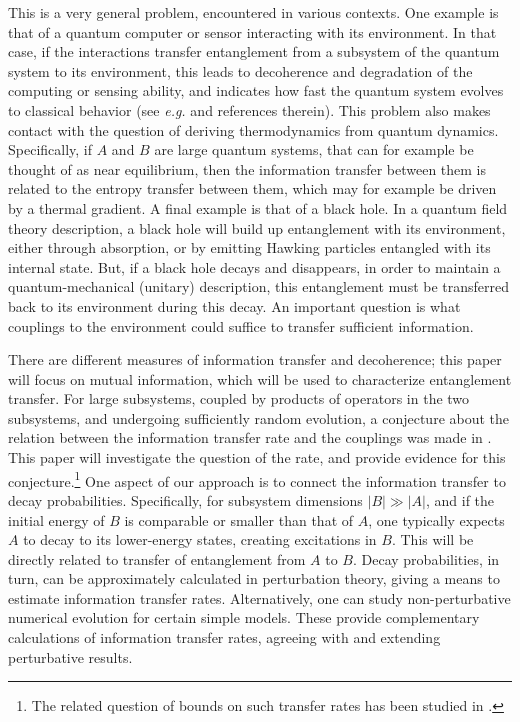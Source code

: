 \documentclass[aps,prd,groupedaddress,nofootinbib,letterpaper]{revtex4}
\begin{document}
This is a very general problem, encountered in various contexts.  One example is that of a quantum computer or sensor interacting with its environment.  In that case, if the interactions transfer entanglement from a subsystem of the quantum system to its environment, this leads to decoherence and degradation of the computing or sensing ability, and indicates how fast the quantum system evolves to classical behavior (see {\it e.g.} \cite{Ahar, Schl} and references therein).  This problem also makes contact with the question of deriving thermodynamics from quantum dynamics\cite{GoEi,GHRRS}.  Specifically, if $A$ and $B$ are large quantum systems, that can for example be thought of as near equilibrium, then the information transfer between them is related to the entropy transfer between them, which may for example be driven by a thermal gradient.  A final example is that of a black hole.  In a quantum field theory description, a black hole will build up entanglement with its environment, either through absorption, or by emitting Hawking particles entangled with its internal state.  But, if a black hole decays and disappears, in order to maintain a quantum-mechanical (unitary) description, this entanglement must be transferred back to its environment during this decay.  An important question is what couplings to the environment could suffice\cite{SGmodels,NVFT,NVU} to transfer sufficient information.  

There are different measures of information transfer and decoherence; this paper will focus on mutual information, which will be used to characterize entanglement transfer.  For large subsystems, coupled by products of operators in the two subsystems, and undergoing sufficiently random evolution, a conjecture about the relation between the information transfer rate and the couplings was made in \cite{NVU}.  This paper will investigate the question of the rate, and provide evidence for this conjecture.\footnote{The related question of bounds on such transfer rates has been studied in \cite{BHV, Brav, AMV}.}  One aspect of our approach is to connect the information transfer to decay probabilities.  Specifically, for subsystem dimensions $|B|\gg|A|$, and if the initial energy of $B$ is comparable or smaller than that of $A$, one typically expects $A$ to decay to its lower-energy states, creating excitations in $B$.  This will be directly related to transfer of entanglement from $A$ to $B$.  Decay probabilities, in turn, can be approximately calculated in perturbation theory, giving a means to estimate information transfer rates.  Alternatively, one can study non-perturbative numerical evolution for certain simple models.  These provide complementary calculations of information transfer rates, agreeing with and extending perturbative results.  
\end{document}
